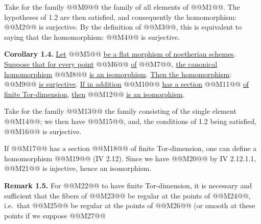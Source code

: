 Take
for the family @@M0@@ the family of all elements of @@M1@@. The hypotheses of 1.2 are then satisfied, and consequently the homomorphism:
@@M2@@
is surjective. By the definition of @@M3@@, this is equivalent to saying that the homomorphism:
@@M4@@
is surjective.

\textbf{Corollary 1.4.} \uline{Let} @@M5@@ \uline{be a flat morphism of noetherian schemes}. \uline{Suppose that for every point} @@M6@@ \uline{of} @@M7@@, \uline{the canonical homomorphism} @@M8@@ \uline{is an isomorphism}. \uline{Then the homomorphism}:
@@M9@@
\uline{is surjective}. \uline{If in addition} @@M10@@ \uline{has a section} @@M11@@ \uline{of finite Tor-dimension}, \uline{then} @@M12@@ \uline{is an isomorphism}.

Take for the family @@M13@@ the family consisting of the single element @@M14@@; we then have @@M15@@, and, the conditions of 1.2 being satisfied, @@M16@@ is surjective.

If @@M17@@ has a section @@M18@@ of finite Tor-dimension, one can define a homomorphism @@M19@@ (IV 2.12). Since we have @@M20@@ by IV 2.12.1.1, @@M21@@ is injective, hence an isomorphism.

\textbf{Remark 1.5.} For @@M22@@ to have finite Tor-dimension, it is necessary and sufficient that the fibers of @@M23@@ be regular at the points of @@M24@@, i.e.\ that @@M25@@ be regular at the points of @@M26@@ (or smooth at these points if we suppose @@M27@@
